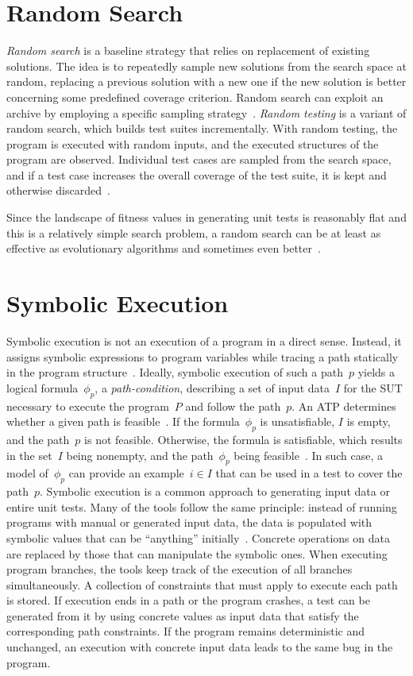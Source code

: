 \documentclass[paper=a4,%
  twoside,%
  BCOR4mm,%
  abstract=true,%
  toc=bibliography,%
  chapterprefix=true,%
  toc=bibliographynumbered,%
  open=right,%
  english,%
  pagesize=pdftex]{scrreprt}
\newcommand{\sut}{\ac{SUT}\xspace}
\newcommand{\todo}[1]{\textbf{TODO: #1}}
\begin{document}
\section{Random Search}
\emph{Random search} is a baseline strategy that relies on replacement of existing solutions. The idea is to repeatedly sample new solutions from the search space at random, replacing a previous solution with a new one if the new solution is better concerning some predefined coverage criterion. Random search can exploit an archive by employing a specific sampling strategy~\cite{Campos2017}. \emph{Random testing} is a variant of random search, which builds test suites incrementally. With random testing, the program is executed with random inputs, and the executed structures of the program are observed. Individual test cases are sampled from the search space, and if a test case increases the overall coverage of the test suite, it is kept and otherwise discarded~\cite{Campos2017}.

Since the landscape of fitness values in generating unit tests is reasonably flat and this is a relatively simple search problem, a random search can be at least as effective as evolutionary algorithms and sometimes even better~\cite{Shamshiri2015a}.

\section{Symbolic Execution}
Symbolic execution is not an execution of a program in a direct sense. Instead, it assigns symbolic expressions to program variables while tracing a path statically in the program structure~\cite{McMinn_2004}. Ideally, symbolic execution of such a path~$p$ yields a logical formula~$\phi_{p}$, a \emph{path-condition}, describing a set of input data~$I$ for the \sut necessary to execute the program~$P$ and follow the path~$p$. An \ac{ATP} determines whether a given path is feasible~\cite{Clarke1976,King1976}. If the formula~$\phi_{p}$ is unsatisfiable, $I$ is empty, and the path~$p$ is not feasible. Otherwise, the formula is satisfiable, which results in the set~$I$ being nonempty, and the path~$\phi_{p}$ being feasible~\cite{Ball2015}. In such case, a model of~$\phi_{p}$ can provide an example~$i \in I$ that can be used in a test to cover the path~$p$. Symbolic execution is a common approach to generating input data or entire unit tests. Many of the tools follow the same principle: instead of running programs with manual or generated input data, the data is populated with symbolic values that can be ``anything'' initially~\cite{cadar2008klee}. Concrete operations on data are replaced by those that can manipulate the symbolic ones. When executing program branches, the tools keep track of the execution of all branches simultaneously. A collection of constraints that must apply to execute each path is stored. If execution ends in a path or the program crashes, a test can be generated from it by using concrete values as input data that satisfy the corresponding path constraints. If the program remains deterministic and unchanged, an execution with concrete input data leads to the same bug in the program.
\end{document}
